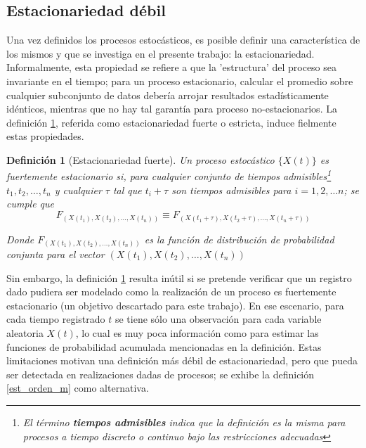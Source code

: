 \documentclass[12pt,a4paper]{mitthesis}
\newtheorem{defn}{Definici\'on}
\begin{document}
\subsection{Estacionariedad d\'ebil}

Una vez definidos los procesos estoc\'asticos, es posible definir una caracter\'istica de los 
mismos y que se investiga en el presente trabajo: la estacionariedad.
Informalmente, esta propiedad se refiere a que la 'estructura' del proceso sea invariante en el
tiempo; para un proceso estacionario, calcular el promedio sobre cualquier subconjunto de datos 
deber\'ia arrojar resultados estad\'isticamente id\'enticos, mientras que no hay tal garant\'ia
para proceso no-estacionarios.
La definici\'on \ref{est_fuerte}, referida como estacionariedad fuerte o estricta, induce fielmente 
estas propiedades.

\begin{defn}[Estacionariedad fuerte]
Un proceso estoc\'astico $\{ X(t) \}$ es fuertemente estacionario si, para cualquier conjunto de 
tiempos admisibles\footnote{El t\'ermino \textbf{tiempos admisibles} indica que la definici\'on es 
la misma para procesos a tiempo discreto o continuo bajo las restricciones adecuadas} 
$t_1,t_2,\dots,t_n$ y cualquier $\tau$ tal que $t_i+\tau$ son tiempos admisibles para 
$i = 1, 2, \dots n$; se cumple que
\begin{equation*}
F_{\left(X(t_1),X(t_2),\dots,X(t_n)\right) }
\equiv
F_{\left(X(t_1+\tau),X(t_2+\tau),\dots,X(t_n+\tau)\right)}
\end{equation*}

Donde $F_{\left(X(t_1),X(t_2),\dots,X(t_n)\right) }$ es la funci\'on de distribuci\'on de 
probabilidad conjunta para el vector $\left(X(t_1),X(t_2),\dots,X(t_n)\right)$
\label{est_fuerte}
\end{defn}

Sin embargo, la definici\'on \ref{est_fuerte} resulta in\'util si se pretende verificar que un 
registro dado pudiera ser modelado como la realizaci\'on de un proceso es fuertemente estacionario 
(un objetivo descartado para este trabajo). En ese escenario, para cada tiempo registrado $t$ se 
tiene s\'olo una observaci\'on para cada variable aleatoria $X(t)$, lo cual es muy poca 
informaci\'on como para estimar las funciones de probabilidad acumulada mencionadas en la 
definici\'on.
Estas limitaciones motivan una definici\'on m\'as d\'ebil de estacionariedad, pero que pueda ser 
detectada en realizaciones dadas de procesos; se exhibe la definici\'on \ref{est_orden_m} como 
alternativa.
\end{document}
